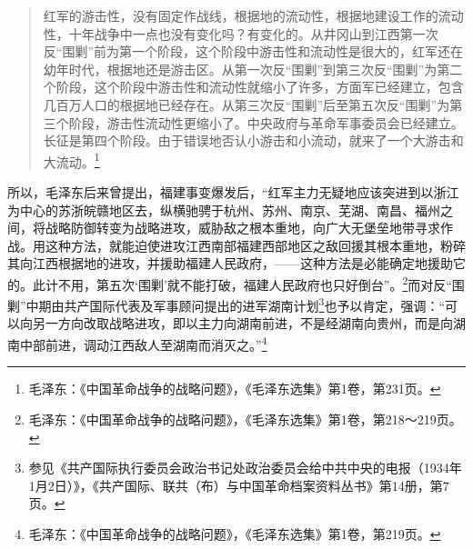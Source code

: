 \begin{quote}

红军的游击性，没有固定作战线，根据地的流动性，根据地建设工作的流动性，十年战争中一点也没有变化吗？有变化的。从井冈山到江西第一次反“围剿”前为第一个阶段，这个阶段中游击性和流动性是很大的，红军还在幼年时代，根据地还是游击区。从第一次反“围剿”到第三次反“围剿”为第二个阶段，这个阶段中游击性和流动性就缩小了许多，方面军已经建立，包含几百万人口的根据地已经存在。从第三次反“围剿”后至第五次反“围剿”为第三个阶段，游击性流动性更缩小了。中央政府与革命军事委员会已经建立。长征是第四个阶段。由于错误地否认小游击和小流动，就来了一个大游击和大流动。\footnote{毛泽东：《中国革命战争的战略问题》，《毛泽东选集》第1卷，第231页。}
\end{quote}


所以，毛泽东后来曾提出，福建事变爆发后，“红军主力无疑地应该突进到以浙江为中心的苏浙皖赣地区去，纵横驰骋于杭州、苏州、南京、芜湖、南昌、福州之间，将战略防御转变为战略进攻，威胁敌之根本重地，向广大无堡垒地带寻求作战。用这种方法，就能迫使进攻江西南部福建西部地区之敌回援其根本重地，粉碎其向江西根据地的进攻，并援助福建人民政府，——这种方法是必能确定地援助它的。此计不用，第五次‘围剿’就不能打破，福建人民政府也只好倒台”。\footnote{毛泽东：《中国革命战争的战略问题》，《毛泽东选集》第1卷，第218～219页。}而对反“围剿”中期由共产国际代表及军事顾问提出的进军湖南计划\footnote{参见《共产国际执行委员会政治书记处政治委员会给中共中央的电报（1934年1月2日）》，《共产国际、联共（布）与中国革命档案资料丛书》第14册，第7页。}也予以肯定，强调：“可以向另一方向改取战略进攻，即以主力向湖南前进，不是经湖南向贵州，而是向湖南中部前进，调动江西敌人至湖南而消灭之。”\footnote{毛泽东：《中国革命战争的战略问题》，《毛泽东选集》第1卷，第219页。}


